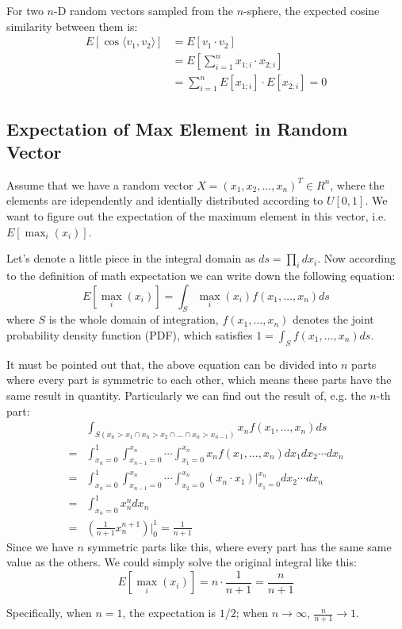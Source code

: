 For two $n$-D random vectors sampled from the $n$-sphere, the expected cosine
similarity between them is:
\begin{align}
	E[\cos\langle v_1, v_2\rangle] &= E[v_1 \cdot v_2] \\
	&= E[\sum_{i=1}^n x_{1;i} \cdot x_{2;i}]\\
	&= \sum_{i=1}^n E[x_{1;i}] \cdot E[x_{2;i}] = 0
\end{align}

\subsection{Expectation of Max Element in Random Vector}

Assume that we have a random vector $X=(x_1,x_2,\ldots,x_n)^T \in R^n$,
where the elements are idependently and identially distributed according to
$U[0, 1]$. We want to figure out the expectation of the maximum element in
this vector, i.e. $E[\max_i(x_i)]$.

Let's denote a little piece in the integral domain as $ds = \prod_i dx_i$.
Now according to the definition of math expectation we can write down the
following equation:
$$E[\max_i(x_i)] = \int_S \max_i(x_i) f(x_1,\ldots,x_n) ds$$
where $S$ is the whole domain of integration, $f(x_1,\ldots,x_n)$ denotes
the joint probability density function (PDF), which satisfies
$1 = \int_S f(x_1,\ldots,x_n) ds$.

It must be pointed out that, the above equation can be divided into $n$ parts
where every part is symmetric to each other, which means these parts have
the same result in quantity. Particularly we can find out the result of, e.g.
the $n$-th part:
\begin{align}
	&\int_{S(x_n>x_1\cap x_n>x_2 \cap \ldots \cap x_n > x_{n-1})} x_n f(x_1,\ldots,x_n) ds\\
	=&\int_{x_n=0}^1 \int_{x_{n-1}=0}^{x_n} \cdots \int_{x_1=0}^{x_n} x_n f(x_1,\ldots,x_n) dx_1 dx_2 \cdots dx_n\\
	=&\int_{x_n=0}^1 \int_{x_{n-1}=0}^{x_n} \cdots \int_{x_2=0}^{x_n} (x_n\cdot x_1)|_{x_1=0}^{x_n} dx_2 \cdots dx_n\\
	=&\int_{x_n=0}^1 x_n^n dx_n\\
	=&(\frac{1}{n+1} x_n^{n+1})|_0^1 = \frac{1}{n+1}
\end{align}
Since we have $n$ symmetric parts like this, where every part has the same same
value as the others. We could simply solve the original integral like this:
$$E[\max_i(x_i)] = n \cdot \frac{1}{n+1} = \frac{n}{n+1}$$

Specifically, when $n=1$, the expectation is $1/2$; when $n\rightarrow \infty$,
$\frac{n}{n+1} \rightarrow 1$.
